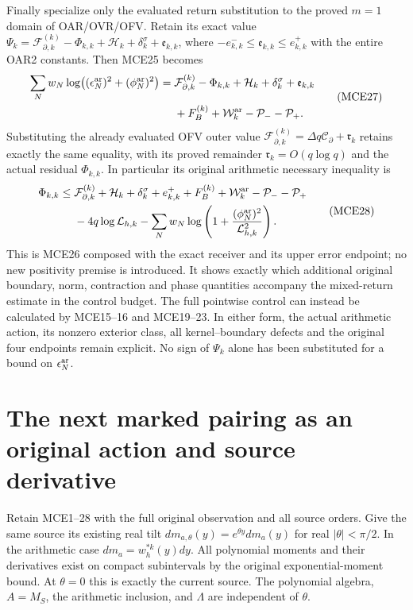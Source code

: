 \documentclass[11pt,a4paper]{article}
\begin{document}
Finally specialize only the evaluated return substitution to the
proved $m=1$ domain of OAR/OVR/OFV. Retain its exact value
$\Psi_k=\mathcal F_{\partial,k}^{(k)}-\Phi_{k,k}
+\mathcal H_k+\delta_k^\sigma+\mathfrak e_{k,k}$,
where $-e_{k,k}^-\le\mathfrak e_{k,k}\le e_{k,k}^+$ with the
entire OAR2 constants. Then MCE25 becomes
\[
 \begin{split}
 \sum_Nw_N\log\bigl((\epsilon_N^{\rm ar})^2+(\phi_N^{\rm ar})^2\bigr)
 ={}&\mathcal F_{\partial,k}^{(k)}-\Phi_{k,k}
       +\mathcal H_k+\delta_k^\sigma+\mathfrak e_{k,k}\\
    &+F_B^{(k)}+\mathcal W_k^{\rm ar}-\mathcal P_--\mathcal P_+ .
 \end{split}\tag{MCE27}
\]
Substituting the already evaluated OFV outer value
$\mathcal F_{\partial,k}^{(k)}
=\Delta q\mathcal C_{\partial}+\mathfrak r_k$
retains exactly the same equality, with its proved remainder
$\mathfrak r_k=O(q\log q)$ and the actual residual $\Phi_{k,k}$.
In particular its original arithmetic necessary inequality is
\[
 \begin{split}
 \Phi_{k,k}\le{}&\mathcal F_{\partial,k}^{(k)}
       +\mathcal H_k+\delta_k^\sigma+e_{k,k}^+
       +F_B^{(k)}+\mathcal W_k^{\rm ar}-\mathcal P_--\mathcal P_+\\
       &-4q\log\mathcal L_{h,k}
       -\sum_Nw_N\log\left(1+
                    \frac{(\phi_N^{\rm ar})^2}{\mathcal L_{h,k}^2}\right).
 \end{split}\tag{MCE28}
\]
This is MCE26 composed with the exact receiver and its upper error
endpoint; no new positivity premise is introduced. It shows exactly
which additional original boundary, norm, contraction and phase
quantities accompany the mixed-return estimate in the control budget.
The full pointwise control can instead be calculated by MCE15--16
and MCE19--23. In either form, the actual arithmetic action, its
nonzero exterior class, all kernel--boundary defects and the
original four endpoints remain explicit. No sign of $\Psi_k$ alone
has been substituted for a bound on $\epsilon_N^{\rm ar}$.


\clearpage
\section{The next marked pairing as an original action and source derivative}
\label{sec:MCP}
Retain MCE1--28 with the full original observation and all source
orders. Give the same source its existing real tilt
$dm_{a,\theta}(y)=e^{\theta y}dm_a(y)$ for real
$|\theta|<\pi/2$. In the arithmetic case $dm_a=w_h^{*k}(y)dy$.
All polynomial moments and their derivatives exist on compact
subintervals by the original exponential-moment bound. At
$\theta=0$ this is exactly the current source. The polynomial
algebra, $A=M_S$, the arithmetic inclusion, and $\Lambda$ are
independent of $\theta$.
\end{document}
